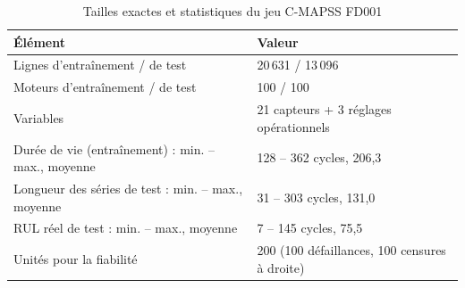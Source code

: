 \begin{table}[htbp]
\centering
\caption{Tailles exactes et statistiques du jeu C-MAPSS FD001}
\label{tab:donnees_tailles}
\begin{tabular}{ll}
\toprule
Élément & Valeur \\
\midrule
Lignes d'entraînement / de test & 20 631 / 13 096 \\
Moteurs d'entraînement / de test & 100 / 100 \\
Variables & 21 capteurs + 3 réglages opérationnels \\
Durée de vie (entraînement) : min. – max., moyenne & 128 – 362 cycles, 206,3 \\
Longueur des séries de test : min. – max., moyenne & 31 – 303 cycles, 131,0 \\
RUL réel de test : min. – max., moyenne & 7 – 145 cycles, 75,5 \\
Unités pour la fiabilité & 200 (100 défaillances, 100 censures à droite) \\
\bottomrule
\end{tabular}
\end{table}
